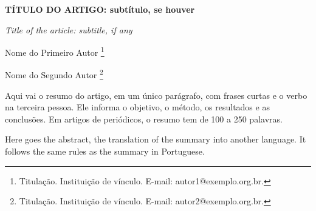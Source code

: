 \documentclass[12pt,a4paper,oneside]{article}
\newcommand{\notadeautor}[2]{#1\begingroup\renewcommand{\thefootnote}{\fnsymbol{footnote}}%
  \footnote{#2}\addtocounter{footnote}{-1}\endgroup}
\begin{document}

\begin{center}
  {\bfseries TÍTULO DO ARTIGO: subtítulo, se houver}\par
  \vspace{\baselineskip}
  {\itshape Title of the article: subtitle, if any}\par
\end{center}

\vspace{\baselineskip}
\begin{flushright}
  \setcounter{footnote}{0}
  \notadeautor{Nome do Primeiro Autor}{Titulação. Instituição de vínculo. E-mail: autor1@exemplo.org.br.}\par
  \setcounter{footnote}{1}
  \notadeautor{Nome do Segundo Autor}{Titulação. Instituição de vínculo. E-mail: autor2@exemplo.org.br.}\par
\end{flushright}
\setcounter{footnote}{0}

\begin{resumo}
Aqui vai o resumo do artigo, em um único parágrafo, com frases curtas e o verbo na terceira pessoa. Ele informa o objetivo, o método, os resultados e as conclusões. Em artigos de periódicos, o resumo tem de 100 a 250 palavras.
\end{resumo}

\begin{otherlanguage}{english}
\begin{resumo}[Abstract]
Here goes the abstract, the translation of the summary into another language. It follows the same rules as the summary in Portuguese.
\end{resumo}
\end{otherlanguage}
\end{document}
